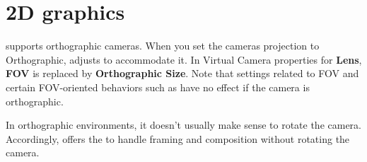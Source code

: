 \chapter{2D graphics}
\hypertarget{md__hey_tea_9_2_library_2_package_cache_2com_8unity_8cinemachine_0d2_89_87_2_documentation_0i_2_cinemachine2_d}{}\label{md__hey_tea_9_2_library_2_package_cache_2com_8unity_8cinemachine_0d2_89_87_2_documentation_0i_2_cinemachine2_d}
\label{md__hey_tea_9_2_library_2_package_cache_2com_8unity_8cinemachine_0d2_89_87_2_documentation_0i_2_cinemachine2_d_autotoc_md481}%
%
  supports orthographic cameras. When you set the  camera\textquotesingle{}s projection to Orthographic,  adjusts to accommodate it. In Virtual Camera properties for {\bfseries{Lens}}, {\bfseries{FOV}} is replaced by {\bfseries{Orthographic Size}}. Note that settings related to FOV and certain FOV-\/oriented behaviors such as  have no effect if the camera is orthographic.

In orthographic environments, it doesn’t usually make sense to rotate the camera. Accordingly,  offers the  to handle framing and composition without rotating the camera. 